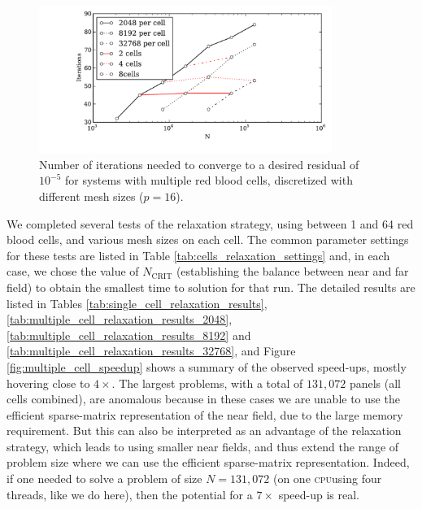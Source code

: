 \documentclass[final,leqno,]{siamltex1213}
\newcommand{\cpu}{\textsc{cpu}}
\newcommand{\ncrit}{N_{\text{CRIT}}}
\begin{document}
\begin{figure}
\begin{center}
	\includegraphics[natwidth=7in,natheight=3.5in,width=0.85\textwidth]{EthrocyteMultipleCellIterations.pdf}
	\caption{Number of iterations needed to converge to a desired residual of $10^{-5}$ for systems with multiple red blood cells, discretized with different mesh sizes ($p = 16$).}
	\label{fig:multiple_cell_iterations}
\end{center}
\end{figure}

We completed several tests of the relaxation strategy, using between 1 and 64 red blood cells, and various mesh sizes on each cell. The common parameter settings for these tests are listed in Table \ref{tab:cells_relaxation_settings} and, in each case, we chose the value of $\ncrit$ (establishing the balance between near and far field) to obtain the smallest time to solution for that run. The detailed results are listed in Tables \ref{tab:single_cell_relaxation_results}, \ref{tab:multiple_cell_relaxation_results_2048}, \ref{tab:multiple_cell_relaxation_results_8192} and \ref{tab:multiple_cell_relaxation_results_32768}, and Figure \ref{fig:multiple_cell_speedup} shows a summary of the observed speed-ups, mostly hovering close to $4\times$. The largest problems, with a total of $131,072$ panels (all cells combined), are anomalous because in these cases we are unable to use the efficient sparse-matrix representation of the near field, due to the large memory requirement. But this can also be interpreted as an advantage of the relaxation strategy, which leads to using smaller near fields, and thus extend the range of problem size where we can use the efficient sparse-matrix representation. Indeed, if one needed to solve a problem of size $N=131,072$ (on one \cpu using four threads, like we do here), then the potential for a $7\times$ speed-up is real.
\end{document}
